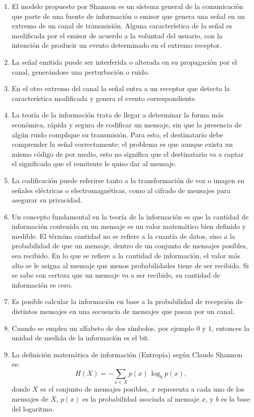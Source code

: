 \begin{enumerate}
	\item El modelo propuesto por Shannon es un sistema general de la comunicación que parte de una fuente de información o emisor que genera una señal en un extremo de un canal de transmisión. Alguna característica de la señal es modificada por el emisor de acuerdo a la voluntad del usuario, con la intención de producir un evento determinado en el extremo receptor.
	\item La señal emitida puede ser interferida o alterada en su propagación por el canal, generándose una perturbación o ruido.
	\item En el otro extremo del canal la señal entra a un receptor que detecta la característica modificada y genera el evento correspondiente.
	\item La teoría de la información trata de llegar a determinar la forma más económica, rápida y segura de codificar un mensaje, sin que la presencia de algún ruido complique su transmisión. Para esto, el destinatario debe comprender la señal correctamente; el problema es que aunque exista un mismo código de por medio, esto no significa que el destinatario va a captar el significado que el remitente le quiso dar al mensaje.
	\item La codificación puede referirse tanto a la transformación de voz o imagen en señales eléctricas o electromagnéticas, como al cifrado de mensajes para asegurar su privacidad.
	\item Un concepto fundamental en la teoría de la información es que la cantidad de información contenida en un mensaje es un valor matemático bien definido y medible. El término cantidad no se refiere a la cuantía de datos, sino a la probabilidad de que un mensaje, dentro de un conjunto de mensajes posibles, sea recibido. En lo que se refiere a la cantidad de información, el valor más alto se le asigna al mensaje que menos probabilidades tiene de ser recibido. Si se sabe con certeza que un mensaje va a ser recibido, su cantidad de información es cero.
	\item Es posible calcular la información en base a la probabilidad de recepción de distintos mensajes en una secuencia de mensajes que pasan por un canal.
	\item Cuando se emplea un alfabeto de dos símbolos, por ejemplo $0$ y $1$, entonces la unidad de medida de la información es el bit.
	\item La definición matemática de información (Entropía) según Claude Shannon es:
	\begin{equation}
		H(X) = - \sum_{x \in X} p(x) \, \log_{b} p(x),
	\end{equation}
	donde $X$ es el conjunto de mensajes posibles, $x$ representa a cada uno de los mensajes de $X$, $p(x)$ es la probabilidad asociada al mensaje $x$, y $b$ es la base del logaritmo.
	

\end{enumerate}

